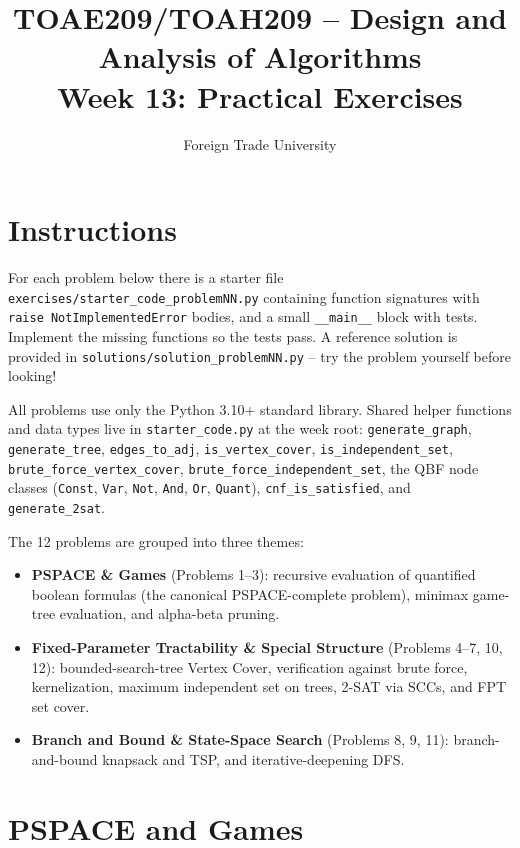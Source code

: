 \documentclass[11pt]{article}
\title{TOAE209/TOAH209 -- Design and Analysis of Algorithms\\[4pt]
\large Week 13: Practical Exercises}
\author{Foreign Trade University}
\date{}
\begin{document}
\maketitle

\section*{Instructions}

For each problem below there is a starter file
\texttt{exercises/starter\_code\_problemNN.py} containing function signatures
with \texttt{raise NotImplementedError} bodies, and a small \texttt{\_\_main\_\_}
block with tests. Implement the missing functions so the tests pass. A reference
solution is provided in \texttt{solutions/solution\_problemNN.py} -- try the
problem yourself before looking!

All problems use only the Python 3.10+ standard library. Shared helper functions
and data types live in \texttt{starter\_code.py} at the week root:
\texttt{generate\_graph}, \texttt{generate\_tree}, \texttt{edges\_to\_adj},
\texttt{is\_vertex\_cover}, \texttt{is\_independent\_set},
\texttt{brute\_force\_vertex\_cover}, \texttt{brute\_force\_independent\_set},
the QBF node classes (\texttt{Const}, \texttt{Var}, \texttt{Not}, \texttt{And},
\texttt{Or}, \texttt{Quant}), \texttt{cnf\_is\_satisfied}, and
\texttt{generate\_2sat}.

The 12 problems are grouped into three themes:
\begin{itemize}
    \item \textbf{PSPACE \& Games} (Problems 1--3): recursive evaluation of
    quantified boolean formulas (the canonical PSPACE-complete problem), minimax
    game-tree evaluation, and alpha-beta pruning.
    \item \textbf{Fixed-Parameter Tractability \& Special Structure} (Problems
    4--7, 10, 12): bounded-search-tree Vertex Cover, verification against brute
    force, kernelization, maximum independent set on trees, 2-SAT via SCCs, and
    FPT set cover.
    \item \textbf{Branch and Bound \& State-Space Search} (Problems 8, 9, 11):
    branch-and-bound knapsack and TSP, and iterative-deepening DFS.
\end{itemize}

\newpage
\section{PSPACE and Games}
\end{document}
